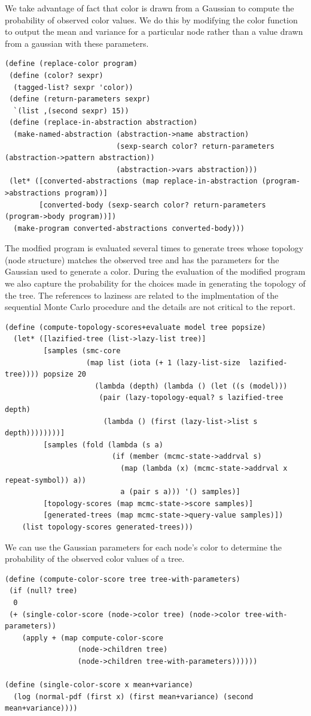 \documentclass[a4paper,10pt]{article}
\begin{document}
We take advantage of fact that color is drawn from a Gaussian to compute the probability of observed color values.  We do this by modifying the color function to output the mean and variance for a particular node rather than a value drawn from a gaussian with these parameters.
\begin{verbatim}
(define (replace-color program)
 (define (color? sexpr)
  (tagged-list? sexpr 'color))
 (define (return-parameters sexpr)
  `(list ,(second sexpr) 15))
 (define (replace-in-abstraction abstraction)
  (make-named-abstraction (abstraction->name abstraction) 
                          (sexp-search color? return-parameters (abstraction->pattern abstraction)) 
                          (abstraction->vars abstraction)))
 (let* ([converted-abstractions (map replace-in-abstraction (program->abstractions program))]
        [converted-body (sexp-search color? return-parameters (program->body program))])
  (make-program converted-abstractions converted-body)))
\end{verbatim}
The modfied program is evaluated several times to generate trees whose topology (node structure) matches the observed tree and has the parameters for the Gaussian used to generate a color.  During the evaluation of the modified program we also capture the probability for the choices made in generating the topology of the tree.  The references to laziness are related to the implmentation of the sequential Monte Carlo procedure and the details are not critical to the report.
\begin{verbatim}
(define (compute-topology-scores+evaluate model tree popsize)
  (let* ([lazified-tree (list->lazy-list tree)]
         [samples (smc-core 
                   (map list (iota (+ 1 (lazy-list-size  lazified-tree)))) popsize 20
                     (lambda (depth) (lambda () (let ((s (model)))
                      (pair (lazy-topology-equal? s lazified-tree depth)
                       (lambda () (first (lazy-list->list s depth))))))))]
         [samples (fold (lambda (s a) 
                         (if (member (mcmc-state->addrval s) 
                           (map (lambda (x) (mcmc-state->addrval x repeat-symbol)) a)) 
                           a (pair s a))) '() samples)]
         [topology-scores (map mcmc-state->score samples)]
         [generated-trees (map mcmc-state->query-value samples)])
    (list topology-scores generated-trees)))
\end{verbatim}
We can use the Gaussian parameters for each node's color to determine the probability of the observed color values of a tree.
\begin{verbatim}
(define (compute-color-score tree tree-with-parameters)
 (if (null? tree)
  0
 (+ (single-color-score (node->color tree) (node->color tree-with-parameters)) 
    (apply + (map compute-color-score 
                 (node->children tree) 
                 (node->children tree-with-parameters))))))

(define (single-color-score x mean+variance)
  (log (normal-pdf (first x) (first mean+variance) (second mean+variance))))
\end{verbatim}
\end{document}
